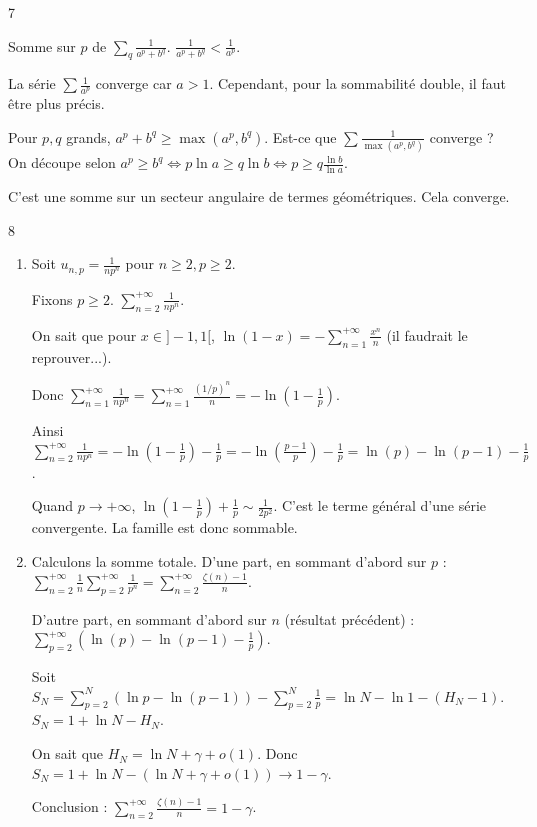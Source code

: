 \begin{correction}{7}
\begin{enumerate}
        Somme sur $p$ de $\sum_q \frac{1}{a^p+b^q}$.
        $\frac{1}{a^p+b^q} < \frac{1}{a^p}$.

        La série $\sum \frac{1}{a^p}$ converge car $a>1$.
        Cependant, pour la sommabilité double, il faut être plus précis.

        Pour $p,q$ grands, $a^p+b^q \ge \max(a^p, b^q)$.
        Est-ce que $\sum \frac{1}{\max(a^p, b^q)}$ converge ?
        On découpe selon $a^p \ge b^q \iff p \ln a \ge q \ln b \iff p \ge q \frac{\ln b}{\ln a}$.

        C'est une somme sur un secteur angulaire de termes géométriques. Cela converge.
\end{enumerate}
\end{correction}

\begin{correction}{8}
\begin{enumerate}
    \item 
        Soit $u_{n,p} = \frac{1}{n p^n}$ pour $n \geqslant 2, p \geqslant 2$.

        Fixons $p \geqslant 2$. $\displaystyle\sum_{n=2}^{+\infty} \frac{1}{n p^n}$.
        
        On sait que pour $x \in ]-1,1[$, $\displaystyle\ln(1-x) = -\sum_{n=1}^{+\infty} \frac{x^n}{n}$ (il faudrait le reprouver...).

        Donc $\displaystyle \sum_{n=1}^{+\infty} \frac{1}{n p^n} = \sum_{n=1}^{+\infty} \frac{(1/p)^n}{n} = -\ln\left(1-\frac{1}{p}\right)$.

        Ainsi $\displaystyle \sum_{n=2}^{+\infty} \frac{1}{n p^n} = -\ln\left(1-\frac{1}{p}\right) - \frac{1}{p} = -\ln\left(\frac{p-1}{p}\right) - \frac{1}{p} = \ln(p) - \ln(p-1) - \frac{1}{p}$.

        Quand $p \to +\infty$, $\ln\left(1-\frac{1}{p}\right) + \frac{1}{p} \sim \frac{1}{2p^2}$.
        C'est le terme général d'une série convergente.
        La famille est donc sommable.
    \item 
        Calculons la somme totale.
        D'une part, en sommant d'abord sur $p$ :
        $\displaystyle \sum_{n=2}^{+\infty} \frac{1}{n} \sum_{p=2}^{+\infty} \frac{1}{p^n} = \sum_{n=2}^{+\infty} \frac{\zeta(n)-1}{n}$.

        D'autre part, en sommant d'abord sur $n$ (résultat précédent) :
        $\displaystyle \sum_{p=2}^{+\infty} \left(\ln(p) - \ln(p-1) - \frac{1}{p}\right)$.
        
        Soit $\displaystyle S_N = \sum_{p=2}^N (\ln p - \ln(p-1)) - \sum_{p=2}^N \frac{1}{p} = \ln N - \ln 1 - (H_N - 1)$.
        $S_N = 1 + \ln N - H_N$.

        On sait que $H_N = \ln N + \gamma + o(1)$.
        Donc $S_N = 1 + \ln N - (\ln N + \gamma + o(1)) \to 1 - \gamma$.

        Conclusion : $\displaystyle \sum_{n=2}^{+\infty} \frac{\zeta(n)-1}{n} = 1-\gamma$.
\end{enumerate}
\end{correction}

